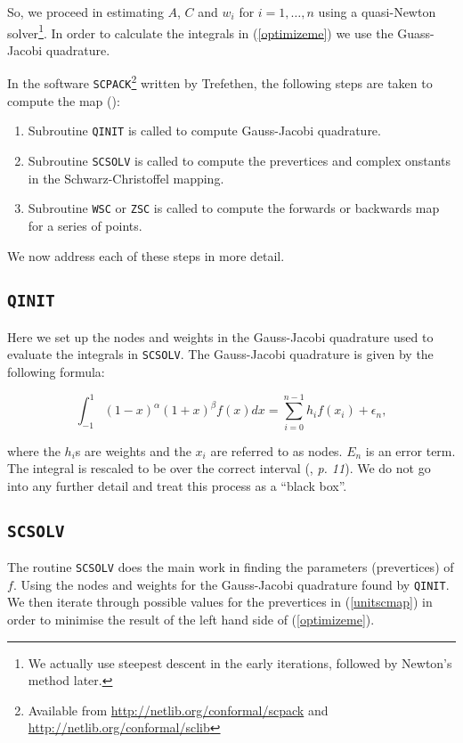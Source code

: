 \documentclass[a4paper,10pt]{amsart}
\newcommand{\sch}{Schwarz-Christoffel }
\begin{document}
So, we proceed in estimating $A$, $C$ and $w_i$ for $i=1,\dots,n$ using a quasi-Newton solver\footnote{We actually use steepest descent in the early iterations, followed by Newton's method later.}. In order to calculate the integrals in (\ref{optimizeme}) we use the Guass-Jacobi quadrature.

In the software \texttt{SCPACK}\footnote{Available from \url{http://netlib.org/conformal/scpack} and \url{http://netlib.org/conformal/sclib}} written by Trefethen, the following steps are taken to compute the map (\cite{scdoc}):

\begin{enumerate}
\item Subroutine \texttt{QINIT} is called to compute Gauss-Jacobi quadrature.
\item Subroutine \texttt{SCSOLV} is called to compute the prevertices and complex onstants in the \sch mapping.
\item Subroutine \texttt{WSC} or \texttt{ZSC} is called to compute the forwards or backwards map for a series of points.
\end{enumerate}

We now address each of these steps in more detail.

\subsection{\texttt{QINIT}}

Here we set up the nodes and weights in the Gauss-Jacobi quadrature used to evaluate the integrals in \texttt{SCSOLV}. The Gauss-Jacobi quadrature is given by the following formula:

\begin{equation}
\int_{-1}^{1} (1-x)^\alpha (1+x)^\beta f(x) dx = \sum_{i=0}^{n-1}h_if(x_i) + \epsilon_n,
\end{equation}

where the $h_i$s are weights and the $x_i$ are referred to as nodes. $E_n$ is an error term. The integral is rescaled to be over the correct interval (\cite{trefethen}, \emph{p. 11}). We do not go into any further detail and treat this process as a ``black box''.

\subsection{\texttt{SCSOLV}}

The routine \texttt{SCSOLV} does the main work in finding the parameters (prevertices) of $f$. Using the nodes and weights for the Gauss-Jacobi quadrature found by \texttt{QINIT}. We then iterate through possible values for the prevertices in (\ref{unitscmap}) in order to minimise the result of the left hand side of (\ref{optimizeme}).
\end{document}
